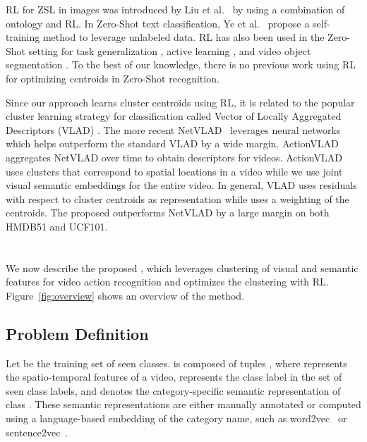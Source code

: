 \documentclass[runningheads]{llncs}
\begin{document}

RL for ZSL in images was introduced by Liu et al.~\cite{liu2018combining} by using a combination of ontology and RL. In Zero-Shot text classification, Ye et al.~\cite{ye2020zero} propose a self-training method
to leverage unlabeled data. RL has also been used in the Zero-Shot setting for task generalization \cite{oh2017zero}, active learning \cite{fan2017learning}, and video object segmentation \cite{gowda2020alba}.
To the best of our knowledge, there is no previous work using RL for optimizing centroids in Zero-Shot  recognition. \\


Since our approach learns cluster centroids using RL, it is related to the popular cluster learning strategy for classification called Vector of Locally Aggregated Descriptors (VLAD) \cite{netvlad}. The more recent NetVLAD~\cite{netvlad} leverages neural networks which helps outperform the  standard VLAD by a wide margin. ActionVLAD~\cite{actionvlad} aggregates NetVLAD over time to obtain descriptors for videos. ActionVLAD uses clusters that correspond to spatial locations in a video while we use joint visual semantic embeddings for the entire video. In general, VLAD uses residuals
with respect to cluster centroids as representation while \MethodName uses a weighting of the centroids. The proposed \MethodName outperforms NetVLAD by a large margin on both HMDB51 and UCF101.


\section{\MethodName}

We now describe the proposed \MethodName, which leverages clustering of visual and semantic features for video action recognition and optimizes the clustering with RL. Figure~\ref{fig:overview} shows an overview of the method. 

\subsection{Problem Definition}




Let  be the training set of seen classes.  is composed of tuples , where  represents the spatio-temporal features of a video,
 represents the class label in the set of  seen class labels, and  denotes the category-specific semantic representation of class . These semantic representations are either manually annotated or
computed using a language-based embedding of the category name, such as word2vec~\cite{word2vec} or sentence2vec~\cite{sentence2vec}. 
\end{document}
